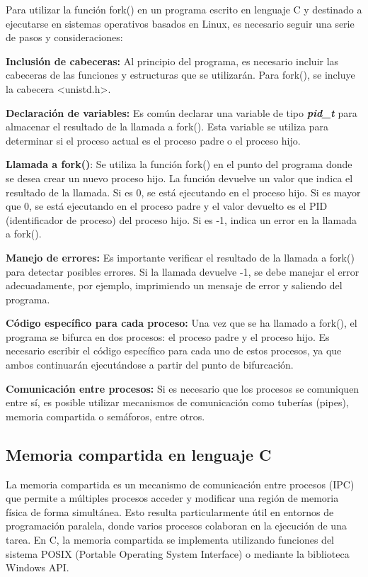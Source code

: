 Para utilizar la función fork() en un programa escrito en lenguaje C y destinado a ejecutarse en sistemas operativos basados en Linux, es necesario seguir una serie de pasos y consideraciones:

\textbf{Inclusión de cabeceras:} Al principio del programa, es necesario incluir las cabeceras de las funciones y estructuras que se utilizarán. Para fork(), se incluye la cabecera \textless unistd.h\textgreater.

\textbf{Declaración de variables:} Es común declarar una variable de tipo \emph{\textbf{pid\_t}} para almacenar el resultado de la llamada a fork(). Esta variable se utiliza para determinar si el proceso actual es el proceso padre o el proceso hijo.

\textbf{Llamada a fork()}: Se utiliza la función fork() en el punto del programa donde se desea crear un nuevo proceso hijo. La función devuelve un valor que indica el resultado de la llamada. Si es 0, se está ejecutando en el proceso hijo. Si es mayor que 0, se está ejecutando en el proceso padre y el valor devuelto es el PID (identificador de proceso) del proceso hijo. Si es -1, indica un error en la llamada a fork().

\textbf{Manejo de errores:} Es importante verificar el resultado de la llamada a fork() para detectar posibles errores. Si la llamada devuelve -1, se debe manejar el error adecuadamente, por ejemplo, imprimiendo un mensaje de error y saliendo del programa.

\textbf{Código específico para cada proceso:} Una vez que se ha llamado a fork(), el programa se bifurca en dos procesos: el proceso padre y el proceso hijo. Es necesario escribir el código específico para cada uno de estos procesos, ya que ambos continuarán ejecutándose a partir del punto de bifurcación.

\textbf{Comunicación entre procesos:} Si es necesario que los procesos se comuniquen entre sí, es posible utilizar mecanismos de comunicación como tuberías (pipes), memoria compartida o semáforos, entre otros.

\subsection{Memoria compartida en lenguaje C}

La memoria compartida es un mecanismo de comunicación entre procesos (IPC) que permite a múltiples procesos acceder y modificar una región de memoria física de forma simultánea. Esto resulta particularmente útil en entornos de programación paralela, donde varios procesos colaboran en la ejecución de una tarea. En C, la memoria compartida se implementa utilizando funciones del sistema POSIX (Portable Operating System Interface) o mediante la biblioteca Windows API.

